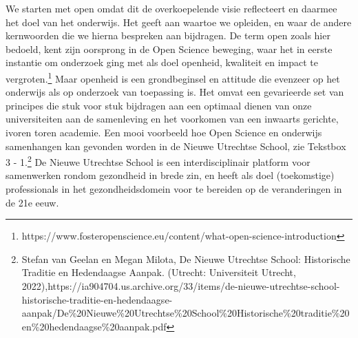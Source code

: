 \documentclass[empirical, authordate, ]{new-jote-article}
\begin{document}
	We starten met open omdat dit de overkoepelende visie reflecteert en daarmee het doel van het onderwijs. Het geeft aan waartoe we opleiden, en waar de andere kernwoorden die we hierna bespreken aan bijdragen. De term open zoals hier bedoeld, kent zijn oorsprong in de Open Science beweging, waar het in eerste instantie om onderzoek ging met als doel openheid, kwaliteit en impact te vergroten.\footnote{https://www.fosteropenscience.eu/content/what-open-science-introduction} Maar openheid is een grondbeginsel en attitude die evenzeer op het onderwijs als op onderzoek van toepassing is. Het omvat een gevarieerde set van principes die stuk voor stuk bijdragen aan een optimaal dienen van onze universiteiten aan de samenleving en het voorkomen van een inwaarts gerichte, ivoren toren academie. Een mooi voorbeeld hoe Open Science en onderwijs samenhangen kan gevonden worden in de Nieuwe Utrechtse School, zie Tekstbox 3 - 1.\footnote{Stefan van Geelan en Megan Milota, De Nieuwe Utrechtse School: Historische Traditie en Hedendaagse Aanpak. (Utrecht: Universiteit Utrecht, 2022),https://ia904704.us.archive.org/33/items/de-nieuwe-utrechtse-school-historische-traditie-en-hedendaagse-aanpak/De\%20Nieuwe\%20Utrechtse\%20School\%20Historische\%20traditie\%20en\%20hedendaagse\%20aanpak.pdf} De Nieuwe Utrechtse School is een interdisciplinair platform voor samenwerken rondom gezondheid in brede zin, en heeft als doel (toekomstige) professionals in het gezondheidsdomein voor te bereiden op de veranderingen in de 21e eeuw.
\end{document}
